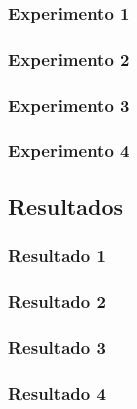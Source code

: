 \documentclass[12pt,letterpaper, margin = 3cm]{article}
\begin{document}
\subsubsection{Experimento 1}
\subsubsection{Experimento 2}
\subsubsection{Experimento 3}
\subsubsection{Experimento 4}

\subsection{Resultados}
\subsubsection{Resultado 1}
\subsubsection{Resultado 2}
\subsubsection{Resultado 3}
\subsubsection{Resultado 4}




\end{document}

